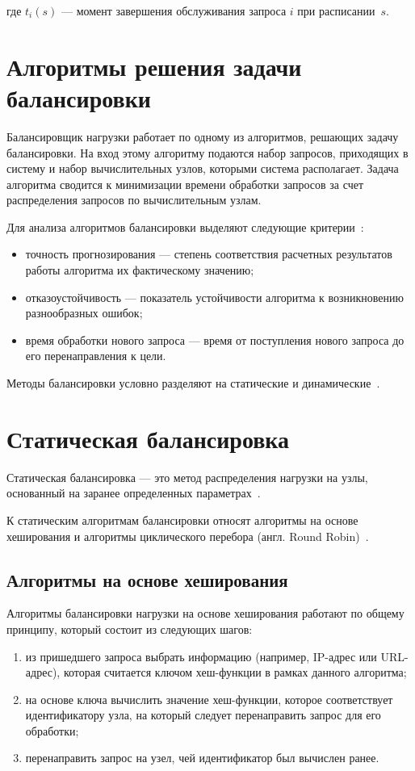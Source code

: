 где $t_i(s)$ --- момент завершения обслуживания запроса $i$ при расписании~$s$.

\section{Алгоритмы решения задачи балансировки}

Балансировщик нагрузки работает по одному из алгоритмов, решающих задачу балансировки.
На вход этому алгоритму подаются набор запросов, приходящих в систему и набор вычислительных узлов, которыми система располагает.
Задача алгоритма сводится к минимизации времени обработки запросов за счет распределения запросов по вычислительным узлам.

Для анализа алгоритмов балансировки выделяют следующие критерии~\cite{com_analysis}:
\begin{itemize}
	\item точность прогнозирования --- степень соответствия расчетных результатов работы алгоритма их фактическому значению;  
	\item отказоустойчивость --- показатель устойчивости алгоритма к возникновению разнообразных ошибок;
	\item время обработки нового запроса --- время от поступления нового запроса до его перенаправления к цели.
\end{itemize}

Методы балансировки условно разделяют на статические и динамические~\cite{drr, com_analysis, rate_comp}. 

\section{Статическая балансировка}

Статическая балансировка --- это метод распределения нагрузки на узлы, основанный на заранее определенных параметрах~\cite{com_analysis, intuit}.

К статическим алгоритмам балансировки относят алгоритмы на основе хеширования и алгоритмы циклического перебора (англ. Round Robin)~\mbox{\cite{nginx, aws, haproxy, part_algos, com_analysis}}.

\subsection{Алгоритмы на основе хеширования}

Алгоритмы балансировки нагрузки на основе хеширования работают по общему принципу, который состоит из следующих шагов:
\begin{enumerate}
	\item из пришедшего запроса выбрать информацию (например, IP-адрес или URL-адрес), которая считается ключом хеш-функции в рамках данного алгоритма;
	\item на основе ключа вычислить значение хеш-функции, которое соответствует идентификатору узла, на который следует перенаправить запрос для его обработки;
	\item перенаправить запрос на узел, чей идентификатор был вычислен ранее.
\end{enumerate}

